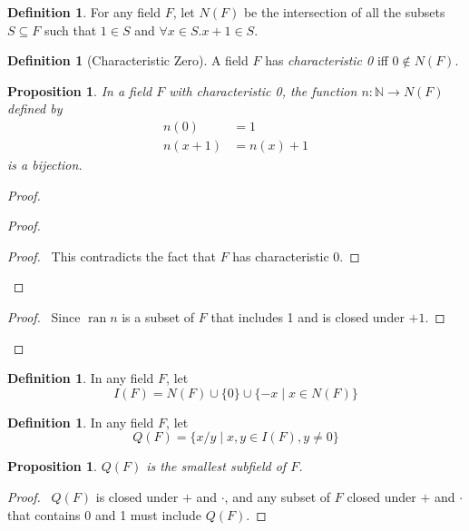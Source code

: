 \documentclass{book}
\let\qed\relax
\newtheorem{prop}[ax]{Proposition}
\theoremstyle{definition}
\newtheorem{df}[ax]{Definition}
\newcommand{\ran}{\ensuremath{\operatorname{ran}}}
\begin{document}
\begin{df}
For any field $F$, let $N(F)$ be the intersection of all the subsets $S \subseteq F$ such that $1 \in S$ and $\forall x \in S. x + 1 \in S$.
\end{df}

\begin{df}[Characteristic Zero]
A field $F$ has \emph{characteristic 0} iff $0 \notin N(F)$.
\end{df}

\begin{prop}
\label{prop:NFbij}
In a field $F$ with characteristic 0, the function $n : \mathbb{N} \rightarrow N(F)$ defined by
\begin{align*}
n(0) & = 1 \\
n(x+1) & = n(x) + 1
\end{align*}
is a bijection.
\end{prop}

\begin{proof}
\pf
{}
\begin{proof}
	\qedstep
	\begin{proof}
		\pf\ This contradicts the fact that $F$ has characteristic 0.
	\end{proof}
\end{proof}
\begin{proof}
	\pf\ Since $\ran n$ is a subset of $F$ that includes 1 and is closed under $+1$.
\end{proof}
\qed
\end{proof}

\begin{df}
In any field $F$, let
\[ I(F) = N(F) \cup \{0\} \cup \{-x \mid x \in N(F) \} \]
\end{df}

\begin{df}
In any field $F$, let
\[ Q(F) = \{ x/y \mid x,y \in I(F), y \neq 0 \} \]
\end{df}

\begin{prop}
$Q(F)$ is the smallest subfield of $F$.
\end{prop}

\begin{proof}
\pf\ $Q(F)$ is closed under $+$ and $\cdot$, and any subset of $F$ closed under $+$ and $\cdot$ that contains 0 and 1 must include $Q(F)$. \qed
\end{proof}
\end{document}
